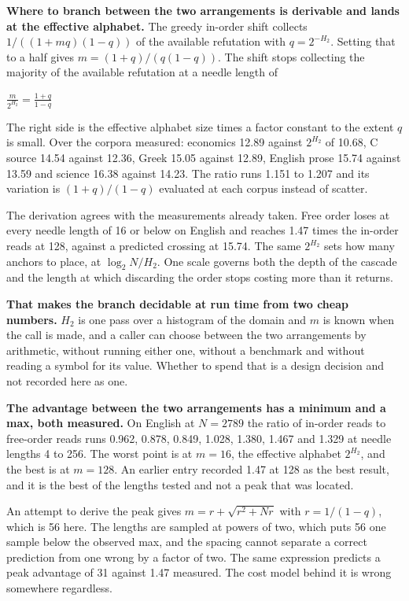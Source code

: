 \textbf{Where to branch between the two arrangements is derivable and lands at the effective alphabet.} The greedy in-order shift collects \(1/((1+mq)(1-q))\) of the available refutation with \(q = 2^{-H_2}\). Setting that to a half gives \(m = (1+q)/(q(1-q))\). The shift stops collecting the majority of the available refutation at a needle length of

\(\frac{m}{2^{H_2}} = \frac{1+q}{1-q}\)

The right side is the effective alphabet size times a factor constant to the extent \(q\) is small. Over the corpora measured: economics 12.89 against \(2^{H_2}\) of 10.68, C source 14.54 against 12.36, Greek 15.05 against 12.89, English prose 15.74 against 13.59 and science 16.38 against 14.23. The ratio runs 1.151 to 1.207 and its variation is \((1+q)/(1-q)\) evaluated at each corpus instead of scatter.

The derivation agrees with the measurements already taken. Free order loses at every needle length of 16 or below on English and reaches 1.47 times the in-order reads at 128, against a predicted crossing at 15.74. The same \(2^{H_2}\) sets how many anchors to place, at \(\log_2 N / H_2\). One scale governs both the depth of the cascade and the length at which discarding the order stops costing more than it returns.

\textbf{That makes the branch decidable at run time from two cheap numbers.} \(H_2\) is one pass over a histogram of the domain and \(m\) is known when the call is made, and a caller can choose between the two arrangements by arithmetic, without running either one, without a benchmark and without reading a symbol for its value. Whether to spend that is a design decision and not recorded here as one.

\textbf{The advantage between the two arrangements has a minimum and a max, both measured.} On English at \(N = 2789\) the ratio of in-order reads to free-order reads runs 0.962, 0.878, 0.849, 1.028, 1.380, 1.467 and 1.329 at needle lengths 4 to 256. The worst point is at \(m = 16\), the effective alphabet \(2^{H_2}\), and the best is at \(m = 128\). An earlier entry recorded 1.47 at 128 as the best result, and it is the best of the lengths tested and not a peak that was located.

An attempt to derive the peak gives \(m = r + \sqrt{r^2 + Nr}\) with \(r = 1/(1-q)\), which is 56 here. The lengths are sampled at powers of two, which puts 56 one sample below the observed max, and the spacing cannot separate a correct prediction from one wrong by a factor of two. The same expression predicts a peak advantage of 31 against 1.47 measured. The cost model behind it is wrong somewhere regardless.


